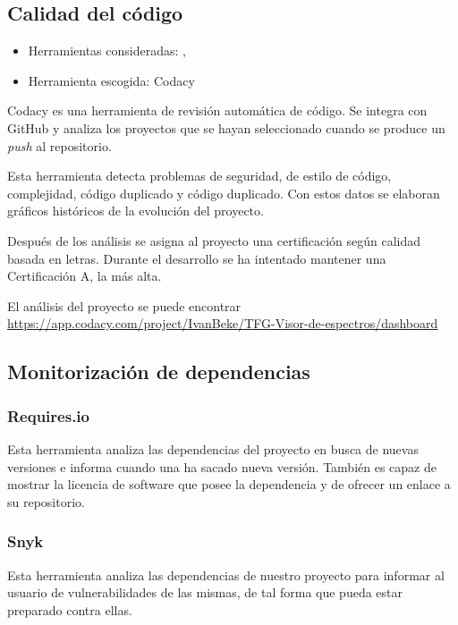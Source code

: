 \subsection{Calidad del código}

\begin{itemize}
	\tightlist
	\item Herramientas consideradas: , 
	\item Herramienta escogida: Codacy
\end{itemize}

Codacy es una herramienta de revisión automática de código. Se integra con GitHub y analiza los proyectos que se hayan seleccionado cuando se produce un \textit{push} al repositorio.

Esta herramienta detecta problemas de seguridad, de estilo de código, complejidad, código duplicado y código duplicado. Con estos datos se elaboran gráficos históricos de la evolución del proyecto.

Después de los análisis se asigna al proyecto una certificación según calidad basada en letras. Durante el desarrollo se ha intentado mantener una Certificación A, la más alta. 

El análisis del proyecto se puede encontrar \url{https://app.codacy.com/project/IvanBeke/TFG-Visor-de-espectros/dashboard}

\subsection{Monitorización de dependencias}

\subsubsection{Requires.io}

Esta herramienta analiza las dependencias del proyecto en busca de nuevas versiones e informa cuando una ha sacado nueva versión. También es capaz de mostrar la licencia de software que posee la dependencia y de ofrecer un enlace a su repositorio.

\subsubsection{Snyk}

Esta herramienta analiza las dependencias de nuestro proyecto para informar al usuario de vulnerabilidades de las mismas, de tal forma que pueda estar preparado contra ellas.

